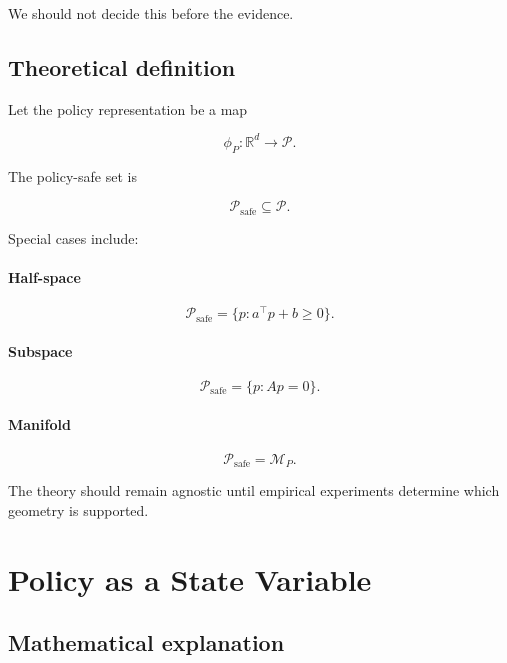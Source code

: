 \documentclass[11pt]{article}
\newcommand{\R}{\mathbb{R}}
\newcommand{\Psafe}{\mathcal{P}_{\mathrm{safe}}}
\begin{document}
We should not decide this before the evidence.

\subsection*{Theoretical definition}

Let the policy representation be a map

\begin{equation}
\phi_P:\R^d\rightarrow\mathcal P.
\end{equation}

The policy-safe set is

\begin{equation}
\Psafe\subseteq\mathcal P.
\end{equation}

Special cases include:

\paragraph{Half-space}
\begin{equation}
\Psafe=\{p:a^\top p+b\geq0\}.
\end{equation}

\paragraph{Subspace}
\begin{equation}
\Psafe=\{p:Ap=0\}.
\end{equation}

\paragraph{Manifold}
\begin{equation}
\Psafe=\mathcal M_P.
\end{equation}

The theory should remain agnostic until empirical experiments determine which
geometry is supported.

\section{Policy as a State Variable}

\subsection*{Mathematical explanation}
\end{document}
